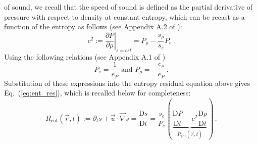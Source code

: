 \documentclass[preprint,10pt]{elsarticle}
\newcommand{\grad}{\vec{\nabla}}
\newcommand{\resi}{R_\text{ent}}
\newcommand{\resinew}{\widetilde{R}_\text{ent}}
\newcommand{\matder}[1]{\frac{\textrm{D} #1}{\textrm{D} t}}
\newcommand{\eqt}[1]{Eq.~(\ref{#1})}                     %
\begin{document}
of sound, we recall that the speed of sound is defined as the partial derivative of pressure with respect to density 
at constant entropy, which can be recast as a function of the entropy as follows (see Appendix A.2 of \cite{jlg}):
%
\begin{equation*}
c^2 := \left. \frac{\partial P}{\partial \rho} \right|_{s=cst} = P_{\rho} - \frac{s_{\rho}}{s_e} P_e   \, .
\end{equation*}
%
Using the following relations (see Appendix A.1 of \cite{jlg})
%
\begin{equation*}
P_e = \frac{1}{e_P} \text{ and } P_{\rho} = -\frac{e_{\rho}}{e_P}  \, .
\end{equation*}
%
Substitution of these expressions into the entropy residual equation above gives \eqt{eq:ent_res}, which is recalled 
below for completeness:
%
\begin{equation*}
\resi(\vec{r},t) := \partial_t s + \vec{u} \cdot \grad s = \matder{s} = \frac{s_e}{P_e} \left( \underbrace{\matder{P} - c^2 \matder{\rho} }_{\resinew(\vec{r},t)} \right) \, .
\end{equation*} 

\newpage
\end{document}
